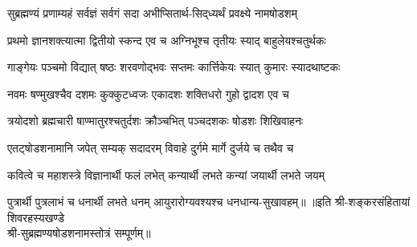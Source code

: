 
\twolineshloka
{सुब्रह्मण्यं प्रणाम्यहं सर्वज्ञं सर्वगं सदा}
{अभीप्सितार्थ-सिद्‌ध्यर्थं प्रवक्ष्ये नामषोडशम्}

\twolineshloka
{प्रथमो ज्ञानशक्त्यात्मा द्वितीयो स्कन्द एव च}
{अग्निभूश्च तृतीयः स्याद् बाहुलेयश्चतुर्थकः}

\twolineshloka
{गाङ्गेयः पञ्चमो विद्यात् षष्ठः शरवणोद्भवः}
{सप्तमः कार्त्तिकेयः स्यात् कुमारः स्यादथाष्टकः}

\twolineshloka
{नवमः षण्मुखश्चैव दशमः कुक्कुटध्वजः}
{एकादशः शक्तिधरो गुहो द्वादश एव च}

\twolineshloka
{त्रयोदशो ब्रह्मचारी षाण्मातुरश्चतुर्दशः}
{क्रौञ्चभित् पञ्चदशकः षोडशः शिखिवाहनः}

\twolineshloka
{एतट्षोडशनामानि जपेत् सम्यक् सदादरम्}
{विवाहे दुर्गमे मार्गे दुर्जये च तथैव च}

\twolineshloka
{कवित्वे च महाशस्त्रे विज्ञानार्थी फलं लभेत्}
{कन्यार्थी लभते कन्यां जयार्थी लभते जयम्}

\twolineshloka
{पुत्रार्थी पुत्रलाभं  च धनार्थी लभते धनम्}
{आयुरारोग्यवश्यश्च धनधान्य-सुखावहम्॥}
॥इति श्री-शङ्करसंहितायां शिवरहस्यखण्डे\\
श्री-सुब्रह्मण्यषोडशनामस्तोत्रं सम्पूर्णम्॥